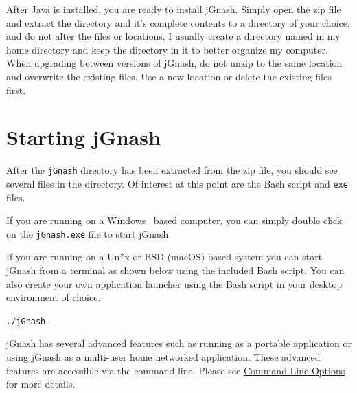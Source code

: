 \documentclass[letterpaper,12pt]{book}
\begin{document}

    After Java is installed, you are ready to install jGnash.
    Simply open the zip file and extract the  directory and it's complete contents to a directory of
    your choice, and do not alter the files or locations.
    I usually create a directory named  in my home directory and keep
    the  directory in it to better organize my computer.
    When upgrading between versions of jGnash, do not unzip to the same location and overwrite the existing files.
    Use a new location or delete the existing files first.

    \section{Starting jGnash}\label{sec:starting-jgnash}

    After the \texttt{jGnash} directory has been extracted from the zip file, you should see several files in the directory.
    Of interest at this point are the Bash script and \texttt{exe} files.

    If you are running on a Windows\texttrademark~ based computer, you can simply double click on the \texttt{jGnash.exe} file to
    start jGnash.

    If you are running on a Un*x or BSD (macOS) based system you can start jGnash from a terminal as shown below using
    the included Bash script.
    You can also create your own application launcher using the Bash script in your desktop environment of choice.

    \begin{mdframed}[style=info]
        \texttt{./jGnash}
    \end{mdframed}

    jGnash has several advanced features such as running as a portable application or using jGnash as a multi-user home
    networked application. These advanced features are accessible via the command line.
    Please see \hyperref[ch:cmdOptions]{Command Line Options} for more details.
\end{document}
